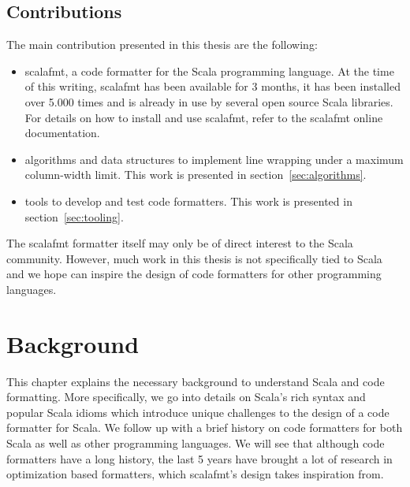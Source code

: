 \documentclass[11pt,a4paper]{article}
\newcommand{\scalafmt}{\texttt{scalafmt}}
\begin{document}

\subsection{Contributions}
The main contribution presented in this thesis are the following:
\begin{itemize}
  \item scalafmt, a code formatter for the Scala programming language.
    At the time of this writing, scalafmt has been available for 3 months, it has been installed over 5.000 times and is already in use by several open source Scala libraries.
    For details on how to install and use scalafmt, refer to the scalafmt online documentation\autocite{geirsson_scalafmt_????}.

  \item algorithms and data structures to implement line wrapping under a maximum column-width limit.
    This work is presented in section~\ref{sec:algorithms}.
  \item tools to develop and test code formatters.
    This work is presented in section~\ref{sec:tooling}.
\end{itemize}
The scalafmt formatter itself may only be of direct interest to the Scala community.
However, much work in this thesis is not specifically tied to Scala and we hope can inspire the design of code formatters for other programming languages.

\section{Background}
This chapter explains the necessary background to understand Scala and code formatting.
More specifically, we go into details on Scala's rich syntax and popular Scala idioms which introduce unique challenges to the design of a code formatter for Scala.
We follow up with a brief history on code formatters for both Scala as well as other programming languages.
We will see that although code formatters have a long history, the last 5 years have brought a lot of research in optimization based formatters, which scalafmt's design takes inspiration from.
\end{document}
